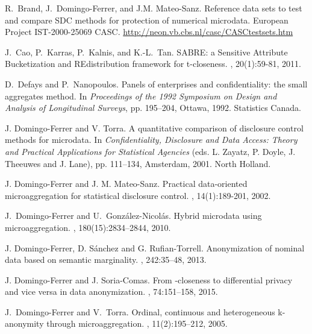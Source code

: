 \documentclass[10pt,journal,compsoc]{IEEEtran}
\theoremstyle{definition}
\theoremstyle{plain}
\begin{document}
\begin{thebibliography}{10}
	
	R.~Brand, J.~Domingo-Ferrer, and J.M. Mateo-Sanz.
	\newblock Reference data sets to test and compare SDC methods for protection of
	numerical microdata.
	\newblock European Project IST-2000-25069 CASC.
\url{http://neon.vb.cbs.nl/casc/CASCtestsets.htm}

	J.~Cao, P.~Karras, P.~Kalnis, and K.-L.~Tan. 
	\newblock SABRE: a Sensitive Attribute Bucketization and REdistribution framework for t-closeness. 
	, 20(1):59-81, 2011.
	
	D.~Defays and P.~Nanopoulos.
	\newblock Panels of enterprises and confidentiality: the small aggregates
	method.
	\newblock In {\em Proceedings of the 1992 Symposium on Design and Analysis of
		Longitudinal Surveys}, pp. 195--204, Ottawa, 1992. Statistics Canada.

 J. Domingo-Ferrer and V. Torra.
\newblock A quantitative comparison of disclosure control methods for 
microdata.
\newblock In {\em Confidentiality, Disclosure and Data Access:
Theory and Practical Applications for Statistical Agencies}
(eds. L. Zayatz, P. Doyle, J. Theeuwes and J. Lane), pp. 111--134,
Amsterdam, 2001. North Holland.

 J. Domingo-Ferrer and J. M. Mateo-Sanz.
\newblock Practical data-oriented microaggregation for statistical
disclosure control.
,
14(1):189-201, 2002.
	
	J.~Domingo-Ferrer and U.~Gonz\'alez-Nicol\'as.
	\newblock Hybrid microdata using microaggregation.
	, 180(15):2834--2844, 2010.

 J. Domingo-Ferrer, D. S\'anchez and G. Rufian-Torrell.
\newblock Anonymization of nominal data based on semantic marginality.
, 242:35--48, 2013.

 J. Domingo-Ferrer and J. Soria-Comas.
\newblock From -closeness to differential privacy and vice versa
in data anonymization.
, 74:151--158, 2015.
	
	J.~Domingo-Ferrer and V.~Torra.
	\newblock Ordinal, continuous and heterogeneous k-anonymity through
	microaggregation.
	, 11(2):195--212, 2005.


\end{thebibliography}
\end{document}
